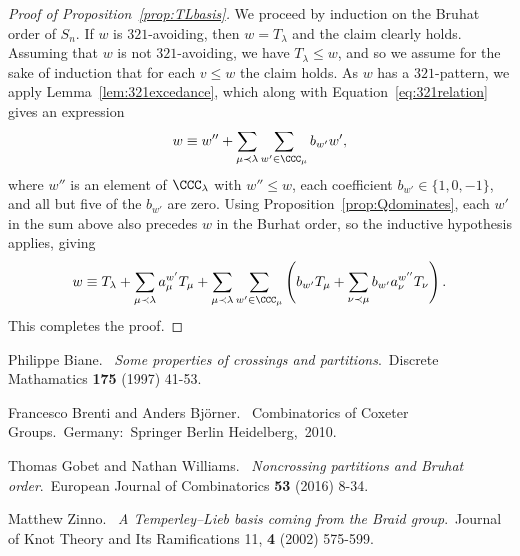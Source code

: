 \documentclass[12pt]{article}
\theoremstyle{definition}
\theoremstyle{remark}
\numberwithin{equation}{section}
\begin{document}
\begin{proof}[Proof of Proposition~\ref{prop:TLbasis}]
We proceed by induction on the Bruhat order of $S_{n}$.  If $w$ is $321$-avoiding, then $w = T_{\lambda}$ and the claim clearly holds.  Assuming that $w$ is not $321$-avoiding, we have $T_{\lambda} \le w$, and so we assume for the sake of induction that for each $v \le w$ the claim holds.  As $w$ has a $321$-pattern, we apply Lemma~\ref{lem:321excedance}, which along with Equation~\eqref{eq:321relation} gives an expression
\[
w \equiv w'' + \sum_{\mu \prec \lambda} \sum_{w' \in \CCC_{\mu}} b_{w'} w',
\]
where $w''$ is an element of $\CCC_{\lambda}$ with $w'' \le w$, each coefficient $b_{w'} \in \{1, 0, -1\}$, and all but five of the $b_{w'}$ are zero.  Using Proposition~\ref{prop:Qdominates}, each $w'$ in the sum above also precedes $w$ in the Burhat order, so the inductive hypothesis applies, giving
\[
w \equiv T_{\lambda} + \sum_{\mu \prec \lambda} a_{\mu}^{w'} T_{\mu} + \sum_{\mu \prec \lambda} \sum_{w' \in \CCC_{\mu}} \left( b_{w'} T_{\mu} + \sum_{\nu \prec \mu} b_{w'} a_{\nu}^{w''} T_{\nu}\right).
\]
This completes the proof.
\end{proof}


\newpage

\begin{thebibliography}{99}
  Philippe Biane.  \textit{Some properties of crossings and partitions}. Discrete Mathamatics {\bf 175} (1997) 41-53.

  Francesco Brenti and Anders Bj\"{o}rner.  Combinatorics of Coxeter Groups. Germany: Springer Berlin Heidelberg, 2010.

  Thomas Gobet and Nathan Williams.  \textit{Noncrossing partitions and Bruhat order}. European Journal of Combinatorics {\bf 53} (2016) 8-34.

  Matthew Zinno.  \textit{A Temperley--Lieb basis coming from the Braid group}. Journal of Knot Theory and Its Ramifications 11, {\bf 4} (2002) 575-599.

\end{thebibliography}
\end{document}
